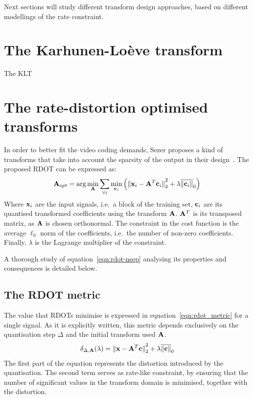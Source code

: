 \documentclass[11pt,a4paper,openright,twoside]{book}
\numberwithin{equation}{section} %
\begin{document}
Next sections will study different transform design approaches, based on
different modellings of the rate constraint.

\section{The Karhunen-Loève transform}
\label{sec:the_karhunen_loeve_transform}
The \ac{KLT}~\cite{rao-01-transform-data-compression-book}

\section{The rate-distortion optimised transforms}
\label{sec:the_rate_distortion_optimised_transforms}

In order to better fit the video coding demands, Sezer proposes a kind
of transforms that take into account the sparsity of the output in their
design~\cite{sezer-11-phd}.
The proposed \ac{RDOT} can be expressed as:
\begin{equation}
	\mathbf{A}_{opt} = \text{arg}\min\limits_{\mathbf{A}}
	\sum_{\forall i} \min\limits_{\mathbf{c}_i}
	\left(
	{\Vert \mathbf{x}_i - \mathbf{A}^T\mathbf{c}_i \Vert}_2^2 + \lambda\overline{\Vert \mathbf{c}_i \Vert}_0
	\right)
	\label{eqn:rdot-nsep}
\end{equation}
Where $\mathbf{x}_i$ are the input signals, i.e.\ a block of the training set,
$\mathbf{c}_i$ are its quantised transformed coefficients using the transform
$\mathbf{A}$.
$\mathbf{A}^T$ is its transposed matrix, as $\mathbf{A}$ is chosen orthonormal.
The constraint in the cost function is the average $\ell_0$ norm of the
coefficients, i.e.\ the number of non-zero coefficients.
Finally, $\lambda$ is the Lagrange multiplier of the constraint.

A thorough study of equation~\ref{eqn:rdot-nsep} analysing its
properties and consequences is detailed below.

\subsection{The \acs{RDOT} metric}
\label{sub:the_rdot_metric}

The value that \acp{RDOT} minimise is expressed in
equation~\ref{eqn:rdot_metric} for a single signal.
As it is explicitly written, this metric depends exclusively on the
quantisation step $\Delta$ and the initial transform used $\mathbf{A}$.
\begin{equation}
	\delta_{\Delta,\mathbf{A}} (\lambda) =
	{\Vert \mathbf{x} - \mathbf{A}^T \mathbf{c} \Vert}_2^2 + \lambda\overline{\Vert \mathbf{c} \Vert}_0
	\label{eqn:rdot_metric}
\end{equation}
The first part of the equation represents the distortion introduced by
the quantisation.
The second term serves as rate-like constraint, by ensuring that the
number of significant values in the transform domain is minimised,
together with the distortion.
\end{document}
